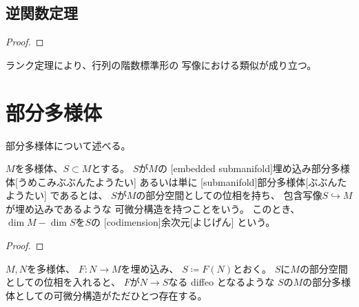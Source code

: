 \documentclass[report]{jlreq}
\begin{document}
\subsection{逆関数定理}


\begin{proof}
    \TODO{}
\end{proof}

ランク定理により、行列の階数標準形の
{\smooth}写像における類似が成り立つ。

\begin{theorem}[ランク定理]
    \TODO{}
\end{theorem}



%
\section{部分多様体}

部分多様体について述べる。

\begin{definition}[部分多様体]
    $M$を多様体、$S \subset M$とする。
    $S$が$M$の
    [embedded submanifold]{埋め込み部分多様体}[うめこみぶぶんたようたい]
    あるいは単に
    [submanifold]{部分多様体}[ぶぶんたようたい]
    であるとは、
    $S$が$M$の部分空間としての位相を持ち、
    包含写像$S \hookrightarrow M$が埋め込みであるような
    可微分構造を持つことをいう。
    このとき、$\dim M - \dim S$を$S$の
    [codimension]{余次元}[よじげん]
    という。
\end{definition}

\begin{proposition}[開部分多様体]
    \TODO{}
\end{proposition}

\begin{proof}
    \TODO{}
\end{proof}

\begin{proposition}[埋め込みの像は部分多様体]
    $M, N$を多様体、
    $F \colon N \to M$を埋め込み、
    $S \coloneqq F(N)$とおく。
    $S$に$M$の部分空間としての位相を入れると、
    $F$が$N \to S$なる diffeo となるような
    $S$の$M$の部分多様体としての可微分構造がただひとつ存在する。
\end{proposition}
\end{document}
